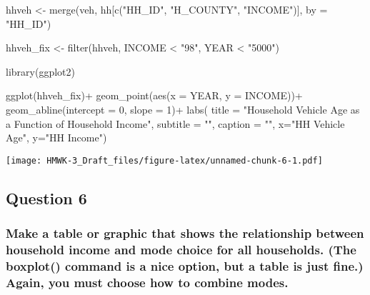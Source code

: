 \documentclass[
]{article}
\newenvironment{Shaded}{\begin{snugshade}}{\end{snugshade}}
\newcommand{\AttributeTok}[1]{\textcolor[rgb]{0.77,0.63,0.00}{#1}}
\newcommand{\DecValTok}[1]{\textcolor[rgb]{0.00,0.00,0.81}{#1}}
\newcommand{\FunctionTok}[1]{\textcolor[rgb]{0.00,0.00,0.00}{#1}}
\newcommand{\NormalTok}[1]{#1}
\newcommand{\OtherTok}[1]{\textcolor[rgb]{0.56,0.35,0.01}{#1}}
\newcommand{\SpecialCharTok}[1]{\textcolor[rgb]{0.00,0.00,0.00}{#1}}
\newcommand{\StringTok}[1]{\textcolor[rgb]{0.31,0.60,0.02}{#1}}
\begin{document}
\begin{Shaded}
\begin{Highlighting}[]
\NormalTok{hhveh }\OtherTok{\textless{}{-}} \FunctionTok{merge}\NormalTok{(veh, hh[}\FunctionTok{c}\NormalTok{(}\StringTok{"HH\_ID"}\NormalTok{, }\StringTok{"H\_COUNTY"}\NormalTok{, }\StringTok{"INCOME"}\NormalTok{)], }\AttributeTok{by =} \StringTok{"HH\_ID"}\NormalTok{)}

\NormalTok{hhveh\_fix }\OtherTok{\textless{}{-}} \FunctionTok{filter}\NormalTok{(hhveh, INCOME }\SpecialCharTok{\textless{}} \StringTok{"98"}\NormalTok{, YEAR }\SpecialCharTok{\textless{}} \StringTok{"5000"}\NormalTok{)}

\FunctionTok{library}\NormalTok{(ggplot2)}

\FunctionTok{ggplot}\NormalTok{(hhveh\_fix)}\SpecialCharTok{+}
  \FunctionTok{geom\_point}\NormalTok{(}\FunctionTok{aes}\NormalTok{(}\AttributeTok{x =}\NormalTok{ YEAR, }
                 \AttributeTok{y =}\NormalTok{ INCOME))}\SpecialCharTok{+}
  \FunctionTok{geom\_abline}\NormalTok{(}\AttributeTok{intercept =} \DecValTok{0}\NormalTok{, }\AttributeTok{slope =} \DecValTok{1}\NormalTok{)}\SpecialCharTok{+}
  \FunctionTok{labs}\NormalTok{(}
    \AttributeTok{title =} \StringTok{"Household Vehicle Age as a Function of Household Income"}\NormalTok{,}
    \AttributeTok{subtitle =} \StringTok{""}\NormalTok{,}
    \AttributeTok{caption =} \StringTok{""}\NormalTok{,}
    \AttributeTok{x=}\StringTok{"HH Vehicle Age"}\NormalTok{, }
    \AttributeTok{y=}\StringTok{"HH Income"}\NormalTok{)}
\end{Highlighting}
\end{Shaded}

\texttt{[image: HMWK-3\_Draft\_files/figure-latex/unnamed-chunk-6-1.pdf]}

\hypertarget{question-6}{%
\subsection{Question 6}\label{question-6}}

\hypertarget{make-a-table-or-graphic-that-shows-the-relationship-between-household-income-and-mode-choice-for-all-households.-the-boxplot-command-is-a-nice-option-but-a-table-is-just-fine.-again-you-must-choose-how-to-combine-modes.}{%
\subsubsection{Make a table or graphic that shows the relationship
between household income and mode choice for all households. (The
boxplot() command is a nice option, but a table is just fine.) Again,
you must choose how to combine
modes.}\label{make-a-table-or-graphic-that-shows-the-relationship-between-household-income-and-mode-choice-for-all-households.-the-boxplot-command-is-a-nice-option-but-a-table-is-just-fine.-again-you-must-choose-how-to-combine-modes.}}
\end{document}
